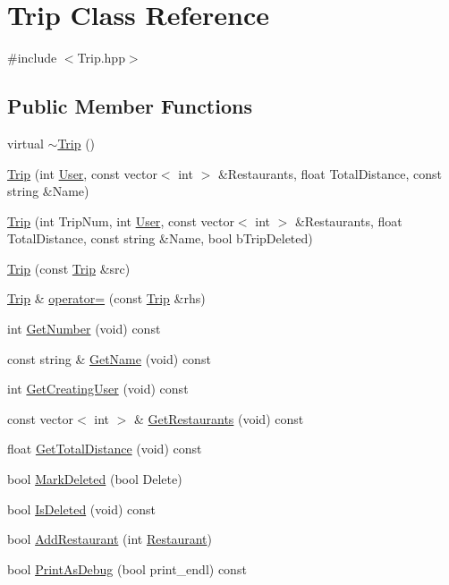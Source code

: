 \hypertarget{classTrip}{\section{Trip Class Reference}
\label{classTrip}
}


{\ttfamily \#include $<$Trip.\-hpp$>$}

\subsection*{Public Member Functions}
\begin{DoxyCompactItemize}
\item 
virtual \hyperlink{classTrip_a2376daed3b03469163782ef0d0533d52}{$\sim$\-Trip} ()
\item 
\hyperlink{classTrip_acc40ce84bd727fcf87bca52766d3e32e}{Trip} (int \hyperlink{classUser}{User}, const vector$<$ int $>$ \&Restaurants, float Total\-Distance, const string \&Name)
\item 
\hyperlink{classTrip_a911733e55bacf367b5525c685df4cd39}{Trip} (int Trip\-Num, int \hyperlink{classUser}{User}, const vector$<$ int $>$ \&Restaurants, float Total\-Distance, const string \&Name, bool b\-Trip\-Deleted)
\item 
\hyperlink{classTrip_adc03c8f6d600f0319fe083966210ae70}{Trip} (const \hyperlink{classTrip}{Trip} \&src)
\item 
\hyperlink{classTrip}{Trip} \& \hyperlink{classTrip_a16e1987dd99c6c5650c2f658e4c7e5c7}{operator=} (const \hyperlink{classTrip}{Trip} \&rhs)
\item 
int \hyperlink{classTrip_acdd93f492bafbf08f4e0d60729af1044}{Get\-Number} (void) const 
\item 
const string \& \hyperlink{classTrip_a3590aa8140eba5355e5fc5405ee95bb4}{Get\-Name} (void) const 
\item 
int \hyperlink{classTrip_a6776387c1783c392977b4ed206dbd7f7}{Get\-Creating\-User} (void) const 
\item 
const vector$<$ int $>$ \& \hyperlink{classTrip_a6f64deeab3d0235ff335b74715a3ff0e}{Get\-Restaurants} (void) const 
\item 
float \hyperlink{classTrip_a996654641498d12de7b8b86bf2cfacc2}{Get\-Total\-Distance} (void) const 
\item 
bool \hyperlink{classTrip_ac2f4c16262173e4eef3a9a80d13ddbf9}{Mark\-Deleted} (bool Delete)
\item 
bool \hyperlink{classTrip_acb8e9846f1c211d78191bdf08d1b6c2c}{Is\-Deleted} (void) const 
\item 
bool \hyperlink{classTrip_a68ccf536e61ca8e03082ab8b78769fbd}{Add\-Restaurant} (int \hyperlink{classRestaurant}{Restaurant})
\item 
bool \hyperlink{classTrip_aeb248b2f0083d775c829403681cc27ce}{Print\-As\-Debug} (bool print\-\_\-endl) const 
\end{DoxyCompactItemize}
